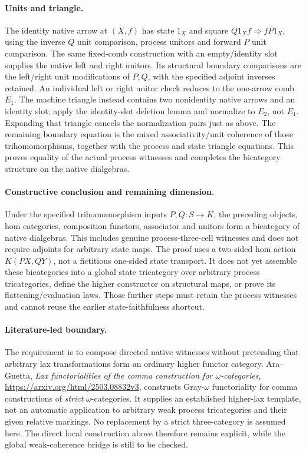 \documentclass{article}
\begin{document}
\paragraph{Units and triangle.} The identity native arrow at $(X,f)$ has state $1_X$ and square $Q1_X f\Rightarrow fP1_X$, using the inverse $Q$ unit comparison, process unitors and forward $P$ unit comparison. The same fixed-comb construction with an empty/identity slot supplies the native left and right unitors. Its structural boundary comparisons are the left/right unit modifications of $P,Q$, with the specified adjoint inverses retained. An individual left or right unitor check reduces to the one-arrow comb $E_1$. The machine triangle instead contains two nonidentity native arrows and an identity slot; apply the identity-slot deletion lemma and normalize to $E_2$, not $E_1$. Expanding that triangle cancels the normalization pairs just as above. The remaining boundary equation is the mixed associativity/unit coherence of those trihomomorphisms, together with the process and state triangle equations. This proves equality of the actual process witnesses and completes the bicategory structure on the native dialgebras.

\paragraph{Constructive conclusion and remaining dimension.} Under the specified trihomomorphism inputs $P,Q:S\to K$, the preceding objects, hom categories, composition functors, associator and unitors form a bicategory of native dialgebras. This includes genuine process-three-cell witnesses and does not require adjoints for arbitrary state maps. The proof uses a two-sided hom action $K(PX,QY)$, not a fictitious one-sided state transport. It does not yet assemble these bicategories into a global state tricategory over arbitrary process tricategories, define the higher constructor on structural maps, or prove its flattening/evaluation laws. Those further steps must retain the process witnesses and cannot reuse the earlier state-faithfulness shortcut.

\paragraph{Literature-led boundary.} The requirement is to compose directed native witnesses without pretending that arbitrary lax transformations form an ordinary higher functor category. Ara--Guetta, \emph{Lax functorialities of the comma construction for $\omega$-categories}, \url{https://arxiv.org/html/2503.08832v3}, constructs Gray-$\omega$ functoriality for comma constructions of \emph{strict} $\omega$-categories. It supplies an established higher-lax template, not an automatic application to arbitrary weak process tricategories and their given relative markings. No replacement by a strict three-category is assumed here. The direct local construction above therefore remains explicit, while the global weak-coherence bridge is still to be checked.
\end{document}
